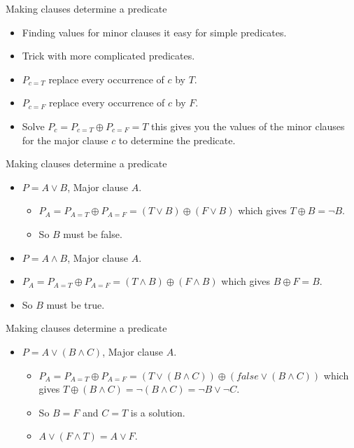\documentclass{beamer}
\begin{document}
\begin{frame}{Making clauses determine a predicate}
  \begin{itemize}
  \item Finding values for minor clauses it easy for simple
    predicates.
  \item Trick with more complicated predicates.
  \item $P_{c=T}$ replace every occurrence of $c$ by $T$.
  \item $P_{c=F}$ replace every occurrence of $c$ by $F$.
  \item Solve $P_c = P_{c=T} \oplus P_{c=F} = T$ this gives you the
    values of the minor clauses for the major clause $c$ to determine
    the predicate.
  \end{itemize}
  
\end{frame}
\begin{frame}{Making clauses determine a predicate}
  \begin{itemize}
  \item $P=A\lor B$, Major clause $A$.
    \begin{itemize}
    \item $P_A = P_{A=T} \oplus P_{A=F} = (T \lor B) \oplus (F
      \lor B)$ which gives $T \oplus B = \neg B$. 
    \item So $B$ must be false.
    \end{itemize}
    \item $P=A\land B$, Major clause $A$.
    \item $P_A = P_{A=T} \oplus P_{A=F} = (T \land B) \oplus (F
      \land B)$ which gives $B \oplus F =  B$. 
    \item So $B$ must be true.
  \end{itemize}
\end{frame}
\begin{frame}{Making clauses determine a predicate}
  \begin{itemize}
  \item $P=A\lor (B\land C)$, Major clause $A$.
    \begin{itemize}
    \item $P_A = P_{A=T} \oplus P_{A=F} = (T \lor (B\land C)) \oplus
      (false 
      \lor (B\land C))$ which gives $T\oplus (B\land C) = \neg (B
      \land C) = \neg B \lor \neg C$.
    \item So $B=F$ and $C=T$ is a solution.
    \item $A \lor (F \land T) = A \lor F$. 
    \end{itemize}

  \end{itemize}
\end{frame}
\end{document}
